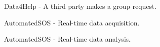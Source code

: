 \begin{figure}[ht]
    \caption{Data4Help - A third party makes a group request.}
    \label{RV8}
\end{figure}

\begin{figure}[ht]
    \caption{AutomatedSOS - Real-time data acquisition.}
    \label{RV9}
\end{figure}

\begin{figure}[ht]
    \caption{AutomatedSOS - Real-time data analysis.}
    \label{RV10}
\end{figure}

